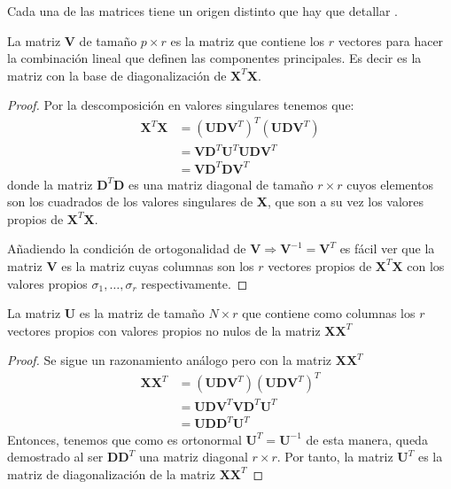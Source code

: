 \noindent Cada una de las matrices tiene un origen distinto que hay que detallar \cite{Johnson 1963}.

\begin{propo}
La matriz $\mathbf{V}$ de tamaño $p\times r$ es la matriz que contiene los $r$ vectores para hacer la combinación lineal que definen las componentes principales. Es decir es la matriz con la base de diagonalización de $\mathbf{X}^T\mathbf{X}$.
\begin{proof}
Por la descomposición en valores singulares tenemos que:
\begin{align*}
\textbf{X}^T \textbf{X} &= (\textbf{U}\mathbf{D} \textbf{V}^T)^T (\textbf{U}\mathbf{D} \textbf{V}^T)\\
&= \textbf{V}\mathbf{D} ^T \textbf{U}^T \textbf{U}\mathbf{D} \textbf{V}^T\\
&= \textbf{V}\mathbf{D} ^T \mathbf{D} \textbf{V}^T
\end{align*}
donde la matriz $\mathbf{D} ^T \mathbf{D} $ es una matriz diagonal de tamaño $r \times r$ cuyos elementos son los cuadrados de los valores singulares de \textbf{X}, que son a su vez los valores propios de $\textbf{X}^T \textbf{X}$. 

\noindent Añadiendo la condición de ortogonalidad de $\textbf{V}\Rightarrow \textbf{V}^{-1}=\mathbf{V}^T$ es fácil ver que la matriz \textbf{V} es la matriz cuyas columnas son los $r$ vectores propios de $\textbf{X}^T\textbf{X}$ con los valores propios $\sigma_1,\ldots, \sigma_r$ respectivamente.
\end{proof}
\end{propo}

\begin{propo}
La matriz $\mathbf{U}$ es la matriz de tamaño $N\times r$ que contiene como columnas los $r$ vectores propios con valores propios no nulos de la matriz $\mathbf{XX}^T$
\begin{proof}
Se sigue un razonamiento análogo pero con la matriz $\mathbf{XX}^T$
\begin{align*}
\textbf{X} \textbf{X}^T  &= (\textbf{U}\mathbf{D} \textbf{V}^T)(\textbf{U}\mathbf{D} \textbf{V}^T)^T\\
&= \mathbf{UDV}^T\mathbf{VD}^T\mathbf{U}^T\\
&= \mathbf{UDD}^T\mathbf{U}^T
\end{align*}
Entonces, tenemos que como es ortonormal $\mathbf{U}^T=\mathbf{U}^{-1}$ de esta manera, queda demostrado al ser $\mathbf{DD}^T$ una matriz diagonal $r\times r$. Por tanto, la matriz $\mathbf{U}^T$ es la matriz de diagonalización de la matriz $\mathbf{XX}^T$
\end{proof}
\end{propo}


